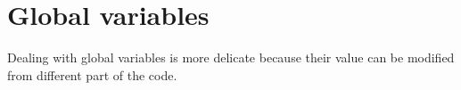 \section{Global variables}
Dealing with global variables is more delicate because their value can be modified from different part of the code.
\begin{comment} %

\begin{mdframed}[style=LuaStyleFrame]
\begin{lstlisting}[style=LuaStyle]
-- Loop with global variable

x = 0

for i=1,1e3 do
	x = x + 11
end
\end{lstlisting}
\end{mdframed}

\noindent
Bytecode
\begin{lstlisting}[style=DumpStyle]
---- TRACE 1 start variables_global.lua:5
0007  GGET     4   0      ; "x"
0008  ADDVN    4   4   0  ; 11
0009  GSET     4   0      ; "x"
0010  FORL     0 => 0007
---- TRACE 1 stop -> loop
\end{lstlisting}

\noindent
IR

\begin{multicols}{2}
\begin{lstlisting}[style=DumpStyle]
---- TRACE 1 start Ex.lua:5
---- TRACE 1 IR
0001 rbp      int SLOAD  #1    CI
0002 rbx      fun SLOAD  #0    R
0003 rdx      tab FLOAD  0002  func.env
0004          int FLOAD  0003  tab.hmask
0005       >  int EQ     0004  +63 
0006 rcx      p32 FLOAD  0003  tab.node
0007 rax   >  p32 HREFK  0006  "x"  @33
0008 xmm7  >  num HLOAD  0007
0009 xmm7   + num ADD    0008  +11 
0010          num HSTORE 0007  0009
0011 rbp    + int ADD    0001  +1  
0012       >  int LE     0011  +1000
0013 ------------ LOOP ------------
0014 xmm7   + num ADD    0009  +11 
0015          num HSTORE 0007  0014
0016 rbp    + int ADD    0011  +1  
0017       >  int LE     0016  +1000
0018 rbp      int PHI    0011  0016
0019 xmm7     num PHI    0009  0014
---- TRACE 1 stop -> loop
\end{lstlisting}
\end{multicols}



\begin{mdframed}[style=LuaStyleFrame]
\begin{lstlisting}[style=LuaStyle]
-- Loop with global variable


\end{comment}

